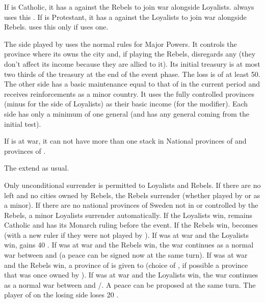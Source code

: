 \phdipl
\aparag If \POLpol is Catholic, it has a \CB against the Rebels to join war
alongside Loyalists. \POLmin always uses this \CB.
\aparag If \DANdan is Protestant, it has a \CB against the Loyalists to join
war alongside Rebels. \DANMin uses this \CB only if \POL uses one.


\phadm
\aparag The side played by \SUE uses the normal rules for Major Powers. It
controls the province where its owns the city and, if playing the Rebels,
disregards any \REVOLT (they don't affect its income because they are allied
to it).
\bparag Its initial treasury is at most two thirds of the treasury at the end
of the event phase. The loss is of at least 50\ducats.
\aparag The other side has a basic maintenance equal to that of \SUE in the
current period and receives reinforcements as a minor country.  It uses the
fully controlled provinces (minus \REVOLT for the side of Loyalists) as their
basic income (for the modifier).
\aparag Each side has only a minimum of one general (and has any general
coming from the initial test).

\phmil
\aparag If \POL is at war, it can not have more than one stack in National
provinces of \paysmajeurSuede and provinces of \regionNorvege.

\phinter
\aparag The \REVOLT extend as usual.

\phpaix
\aparag Only unconditional surrender is permitted to Loyalists and Rebels. If
there are no \REVOLT left and no cities owned by Rebels, the Rebels surrender
(whether played by \SUE or as a minor).  If there are no national provinces of
Sweden not in \REVOLT or controlled by the Rebels, a minor Loyalists surrender
automatically.
\bparag If the Loyalists win, \SUE remains Catholic and has its Monarch ruling
before the event.
\bparag If the Rebels win, \SUE becomes \PROTTOL (with a new ruler if they
were not played by \SUE).
\bparag If \POL was at war and the Loyalists win, \POL gains 40 \PV.
\bparag If \POL was at war and the Rebels win, the war continues as a normal
war between \POL and \SUE (a peace can be signed now at the same turn).
\bparag If \DANdan was at war and the Rebels win, a province of \SUE is given
to \DANdan (choice of \SUE, if possible a province that was once owned by
\DANdan).
\bparag If \DANdan was at war and the Loyalists win, the war continues as a
normal war between \DANdan and \POL/\SUE.  A peace can be proposed at the same
turn.
\aparag The player of \SUE on the losing side loses 20 \PV.



